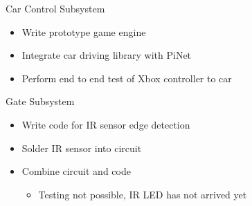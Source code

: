 \documentclass{beamer}
\begin{document}
\begin{frame}{Car Control Subsystem}
\begin{itemize}
    \item Write prototype game engine
    \item Integrate car driving library with PiNet
    \item Perform end to end test of Xbox controller to car
\end{itemize}
\end{frame}
\begin{frame}{Gate Subsystem}
\begin{itemize}
    \item Write code for IR sensor edge detection
    \item Solder IR sensor into circuit
    \item Combine circuit and code
    \begin{itemize}
        \item Testing not possible, IR LED has not arrived yet
    \end{itemize}
\end{itemize}
\end{frame}
\end{document}
